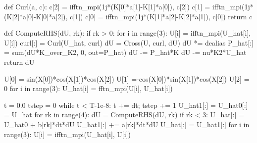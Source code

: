 \documentclass[11pt, oneside]{article}
\begin{document}
\begin{python}
def Curl(a, c):
    c[2] = ifftn_mpi(1j*(K[0]*a[1]-K[1]*a[0]), c[2])
    c[1] = ifftn_mpi(1j*(K[2]*a[0]-K[0]*a[2]), c[1])
    c[0] = ifftn_mpi(1j*(K[1]*a[2]-K[2]*a[1]), c[0])
    return c

def ComputeRHS(dU, rk):
    if rk > 0:
        for i in range(3):
            U[i] = ifftn_mpi(U_hat[i], U[i])
    curl[:] = Curl(U_hat, curl)
    dU = Cross(U, curl, dU)
    dU *= dealias
    P_hat[:] = sum(dU*K_over_K2, 0, out=P_hat)
    dU -= P_hat*K
    dU -= nu*K2*U_hat
    return dU

U[0] = sin(X[0])*cos(X[1])*cos(X[2])
U[1] =-cos(X[0])*sin(X[1])*cos(X[2])
U[2] = 0
for i in range(3):
    U_hat[i] = fftn_mpi(U[i], U_hat[i])

t = 0.0
tstep = 0
while t < T-1e-8:
    t += dt; tstep += 1
    U_hat1[:] = U_hat0[:] = U_hat
    for rk in range(4):
        dU = ComputeRHS(dU, rk)
        if rk < 3: U_hat[:] = U_hat0 + b[rk]*dt*dU
        U_hat1[:] += a[rk]*dt*dU
    U_hat[:] = U_hat1[:]
    for i in range(3):
        U[i] = ifftn_mpi(U_hat[i], U[i])
        
\end{python}
\end{document}

